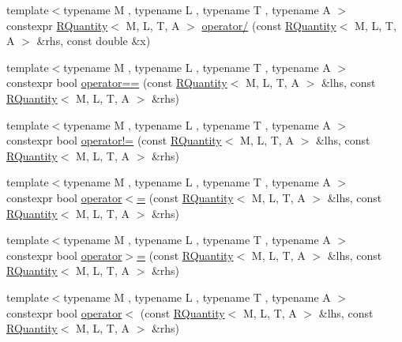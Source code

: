 \begin{DoxyCompactItemize}
\item 
{\footnotesize template$<$typename M , typename L , typename T , typename A $>$ }\\constexpr \mbox{\hyperlink{classokapi_1_1RQuantity}{R\+Quantity}}$<$ M, L, T, A $>$ \mbox{\hyperlink{namespaceokapi_aae60324b5422706049e94e1a7b0b96af}{operator/}} (const \mbox{\hyperlink{classokapi_1_1RQuantity}{R\+Quantity}}$<$ M, L, T, A $>$ \&rhs, const double \&x)
\item 
{\footnotesize template$<$typename M , typename L , typename T , typename A $>$ }\\constexpr bool \mbox{\hyperlink{namespaceokapi_a3f9de8ffeea76c6c278256cb1124ed83}{operator==}} (const \mbox{\hyperlink{classokapi_1_1RQuantity}{R\+Quantity}}$<$ M, L, T, A $>$ \&lhs, const \mbox{\hyperlink{classokapi_1_1RQuantity}{R\+Quantity}}$<$ M, L, T, A $>$ \&rhs)
\item 
{\footnotesize template$<$typename M , typename L , typename T , typename A $>$ }\\constexpr bool \mbox{\hyperlink{namespaceokapi_a118add088592d8d0de817c35cff350b2}{operator!=}} (const \mbox{\hyperlink{classokapi_1_1RQuantity}{R\+Quantity}}$<$ M, L, T, A $>$ \&lhs, const \mbox{\hyperlink{classokapi_1_1RQuantity}{R\+Quantity}}$<$ M, L, T, A $>$ \&rhs)
\item 
{\footnotesize template$<$typename M , typename L , typename T , typename A $>$ }\\constexpr bool \mbox{\hyperlink{namespaceokapi_ae23323562f9b7d57d066a04b5de73f3d}{operator$<$=}} (const \mbox{\hyperlink{classokapi_1_1RQuantity}{R\+Quantity}}$<$ M, L, T, A $>$ \&lhs, const \mbox{\hyperlink{classokapi_1_1RQuantity}{R\+Quantity}}$<$ M, L, T, A $>$ \&rhs)
\item 
{\footnotesize template$<$typename M , typename L , typename T , typename A $>$ }\\constexpr bool \mbox{\hyperlink{namespaceokapi_ae0ea83af0f730da0cb8045e2798b14ca}{operator$>$=}} (const \mbox{\hyperlink{classokapi_1_1RQuantity}{R\+Quantity}}$<$ M, L, T, A $>$ \&lhs, const \mbox{\hyperlink{classokapi_1_1RQuantity}{R\+Quantity}}$<$ M, L, T, A $>$ \&rhs)
\item 
{\footnotesize template$<$typename M , typename L , typename T , typename A $>$ }\\constexpr bool \mbox{\hyperlink{namespaceokapi_a9f4f432db976a139cc66ab71bfbe5ca9}{operator$<$}} (const \mbox{\hyperlink{classokapi_1_1RQuantity}{R\+Quantity}}$<$ M, L, T, A $>$ \&lhs, const \mbox{\hyperlink{classokapi_1_1RQuantity}{R\+Quantity}}$<$ M, L, T, A $>$ \&rhs)

\end{DoxyCompactItemize}
